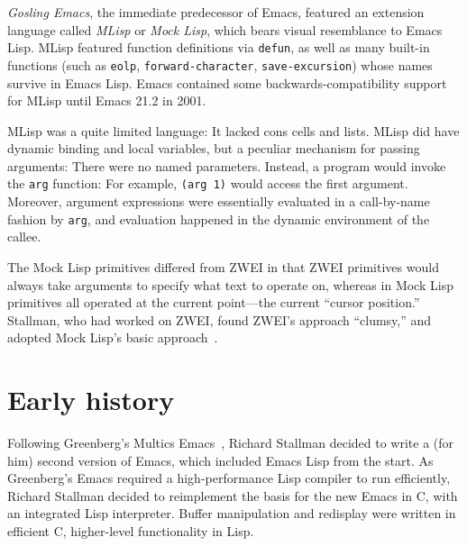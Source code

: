 \documentclass[format=acmsmall, review]{acmart}
\newcommand \Elisp {Emacs Lisp}
\begin{document}
\emph{Gosling Emacs}, the immediate predecessor of
Emacs, featured an extension language called \emph{MLisp} or
\emph{Mock Lisp}, which bears visual resemblance to \Elisp{}.
MLisp featured function definitions via \texttt{defun}, as well as
many built-in functions (such as \texttt{eolp},
\texttt{forward-character}, \texttt{save-excursion}) whose names
survive in \Elisp{}.  Emacs contained some backwards-compatibility
support for MLisp until Emacs 21.2 in 2001.

MLisp was a quite limited language: It lacked cons cells and lists.
MLisp did have dynamic binding and local variables, but a peculiar
mechanism for passing arguments:  There were no named
parameters.  Instead, a program would invoke the \texttt{arg}
function: For example, \texttt{(arg 1)} would access the first
argument.  Moreover, argument expressions were essentially evaluated
in a call-by-name fashion by \texttt{arg}, and evaluation happened in
the dynamic environment of the callee.

The Mock Lisp primitives differed from ZWEI in that ZWEI primitives
would always take arguments to specify what text to operate on,
whereas in Mock Lisp primitives all operated at the current
point---the current ``cursor position.''  Stallman, who had worked on
ZWEI, found ZWEI's approach ``clumsy,'' and adopted Mock Lisp's basic
approach~\cite{Stallman2018-personal}.


\section{Early history}         %
\label{sec:early-history}

Following Greenberg's Multics Emacs~\cite{MulticsEmacs1996},
Richard Stallman decided to write a (for
him) second version of Emacs, which included \Elisp{} from the start.
As Greenberg's Emacs required a high-performance Lisp compiler to run
efficiently, Richard Stallman decided to reimplement the basis for the new
Emacs in C, with an integrated Lisp interpreter.  Buffer manipulation
and redisplay were written in efficient C, higher-level functionality
in Lisp.
\end{document}
